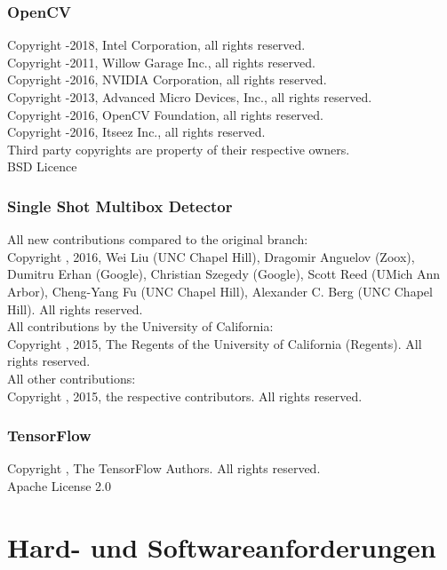 \documentclass[12pt,a4paper,ngerman,enabledeprecatedfontcommands]{article}
\begin{document}
\subsubsection{OpenCV}
Copyright -2018, Intel Corporation, all rights reserved.\\
Copyright -2011, Willow Garage Inc., all rights reserved.\\
Copyright -2016, NVIDIA Corporation, all rights reserved.\\
Copyright -2013, Advanced Micro Devices, Inc., all rights reserved.\\
Copyright -2016, OpenCV Foundation, all rights reserved.\\
Copyright -2016, Itseez Inc., all rights reserved.\\
Third party copyrights are property of their respective owners.\\
BSD Licence

\subsubsection{Single Shot Multibox Detector}
All new contributions compared to the original branch:\\Copyright {}, 2016, Wei Liu (UNC Chapel Hill), Dragomir Anguelov (Zoox), Dumitru Erhan (Google), Christian Szegedy (Google), Scott Reed (UMich Ann Arbor), Cheng-Yang Fu (UNC Chapel Hill), Alexander C. Berg (UNC Chapel Hill). All rights reserved.\\
All contributions by the University of California:\\Copyright {}, 2015, The Regents of the University of California (Regents). All rights reserved.\\
All other contributions:\\Copyright {}, 2015, the respective contributors. All rights reserved.\\

\subsubsection{TensorFlow}
Copyright , The TensorFlow Authors. All rights reserved.\\
Apache License 2.0

\section{Hard- und Softwareanforderungen}
\end{document}
